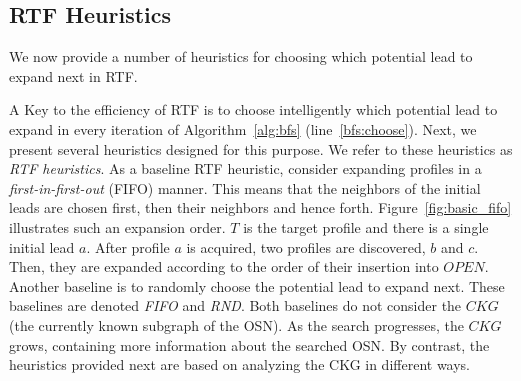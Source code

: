 \documentclass[journal]{IEEEtran}
\begin{document}


\subsection{RTF Heuristics}

We now provide a number of heuristics for choosing which potential lead to expand next in RTF. 

A Key to the efficiency of RTF is to choose intelligently which potential lead to expand in every iteration of Algorithm~\ref{alg:bfs} (line~\ref{bfs:choose}). Next, we present several heuristics designed for this purpose. We refer to these heuristics as {\em RTF heuristics}. As a baseline RTF heuristic, consider expanding profiles in a {\em first-in-first-out} (FIFO) manner. This means that the neighbors of the initial leads are chosen first, then their neighbors and hence forth. 
Figure~\ref{fig:basic_fifo} illustrates such an expansion order. $T$ is the target profile and there is a single initial lead $a$. After profile $a$ is acquired, two profiles are discovered, $b$ and $c$. Then, they are expanded according to the order of their insertion into $OPEN$.
Another baseline is to randomly choose the potential lead to expand next. 
These baselines are denoted {\em FIFO} and {\em RND}. Both baselines do not consider the $CKG$ (the currently known subgraph of the OSN). As the search progresses, the $CKG$ grows, containing more information about the searched OSN. By contrast, the heuristics provided next are based on analyzing the CKG in different ways.
 
\end{document}
